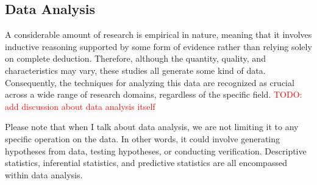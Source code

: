 \documentclass{book}
\begin{document}



\subsection{Data Analysis}
A considerable amount of research is empirical in nature, meaning that it involves inductive reasoning supported by some form of evidence rather than relying solely on complete deduction. Therefore, although the quantity, quality, and characteristics may vary, these studies all generate some kind of data. Consequently, the techniques for analyzing this data are recognized as crucial across a wide range of research domains, regardless of the specific field. \textcolor{red}{TODO: add discussion about data analysis itself}

Please note that when I talk about data analysis, we are not limiting it to any specific operation on the data. In other words, it could involve generating hypotheses from data, testing hypotheses, or conducting verification. Descriptive statistics, inferential statistics, and predictive statistics are all encompassed within data analysis.
\end{document}
